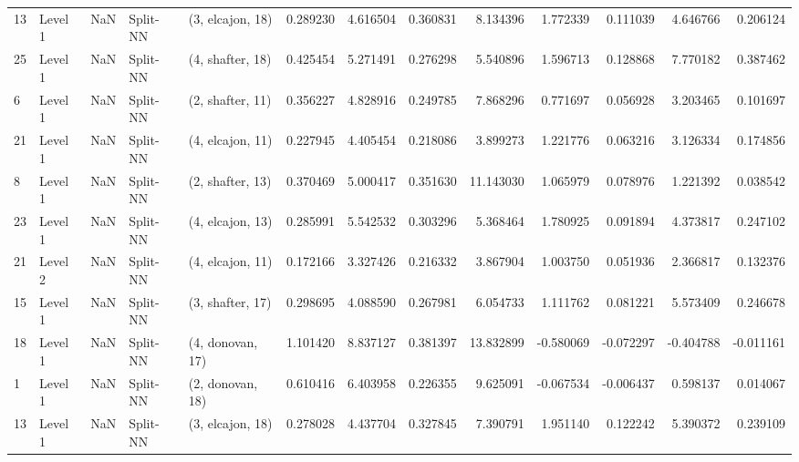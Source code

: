 \begin{tabular}{llrllrrrrrrrr}
13 &   Level 1 &    NaN &       Split-NN &  (3, elcajon, 18) &   0.289230 &   4.616504 &  0.360831 &   8.134396 &             1.772339 &               0.111039 &            4.646766 &              0.206124 \\
25 &   Level 1 &    NaN &       Split-NN &  (4, shafter, 18) &   0.425454 &   5.271491 &  0.276298 &   5.540896 &             1.596713 &               0.128868 &            7.770182 &              0.387462 \\
6  &   Level 1 &    NaN &       Split-NN &  (2, shafter, 11) &   0.356227 &   4.828916 &  0.249785 &   7.868296 &             0.771697 &               0.056928 &            3.203465 &              0.101697 \\
21 &   Level 1 &    NaN &       Split-NN &  (4, elcajon, 11) &   0.227945 &   4.405454 &  0.218086 &   3.899273 &             1.221776 &               0.063216 &            3.126334 &              0.174856 \\
8  &   Level 1 &    NaN &       Split-NN &  (2, shafter, 13) &   0.370469 &   5.000417 &  0.351630 &  11.143030 &             1.065979 &               0.078976 &            1.221392 &              0.038542 \\
23 &   Level 1 &    NaN &       Split-NN &  (4, elcajon, 13) &   0.285991 &   5.542532 &  0.303296 &   5.368464 &             1.780925 &               0.091894 &            4.373817 &              0.247102 \\
21 &   Level 2 &    NaN &       Split-NN &  (4, elcajon, 11) &   0.172166 &   3.327426 &  0.216332 &   3.867904 &             1.003750 &               0.051936 &            2.366817 &              0.132376 \\
15 &   Level 1 &    NaN &       Split-NN &  (3, shafter, 17) &   0.298695 &   4.088590 &  0.267981 &   6.054733 &             1.111762 &               0.081221 &            5.573409 &              0.246678 \\
18 &   Level 1 &    NaN &       Split-NN &  (4, donovan, 17) &   1.101420 &   8.837127 &  0.381397 &  13.832899 &            -0.580069 &              -0.072297 &           -0.404788 &             -0.011161 \\
1  &   Level 1 &    NaN &       Split-NN &  (2, donovan, 18) &   0.610416 &   6.403958 &  0.226355 &   9.625091 &            -0.067534 &              -0.006437 &            0.598137 &              0.014067 \\
13 &   Level 1 &    NaN &       Split-NN &  (3, elcajon, 18) &   0.278028 &   4.437704 &  0.327845 &   7.390791 &             1.951140 &               0.122242 &            5.390372 &              0.239109 \\

\end{tabular}
